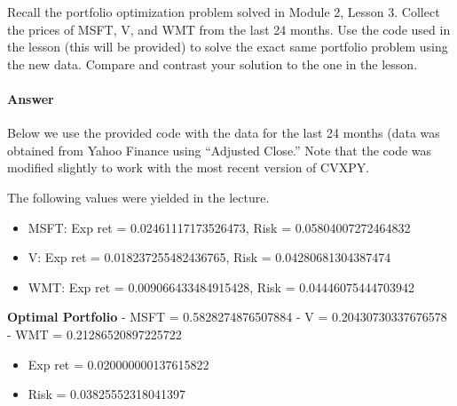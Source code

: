 \documentclass[11pt]{article}
\providecommand{\tightlist}{%
      \setlength{\itemsep}{0pt}\setlength{\parskip}{0pt}}
\begin{document}
Recall the portfolio optimization problem solved in Module 2, Lesson 3.
Collect the prices of MSFT, V, and WMT from the last 24 months. Use the
code used in the lesson (this will be provided) to solve the exact same
portfolio problem using the new data. Compare and contrast your solution
to the one in the lesson.

\hypertarget{answer}{%
\paragraph{Answer}\label{answer}}

Below we use the provided code with the data for the last 24 months
(data was obtained from Yahoo Finance using ``Adjusted Close.'' Note
that the code was modified slightly to work with the most recent version
of CVXPY.

The following values were yielded in the lecture.

\begin{itemize}
\tightlist
\item
  MSFT: Exp ret = 0.02461117173526473, Risk = 0.05804007272464832
\item
  V: Exp ret = 0.018237255482436765, Risk = 0.04280681304387474
\item
  WMT: Exp ret = 0.009066433484915428, Risk = 0.04446075444703942
\end{itemize}

\textbf{Optimal Portfolio} - MSFT = 0.5828274876507884 - V =
0.20430730337676578 - WMT = 0.21286520897225722

\begin{itemize}
\tightlist
\item
  Exp ret = 0.020000000137615822
\item
  Risk = 0.03825552318041397
\end{itemize}
\end{document}
